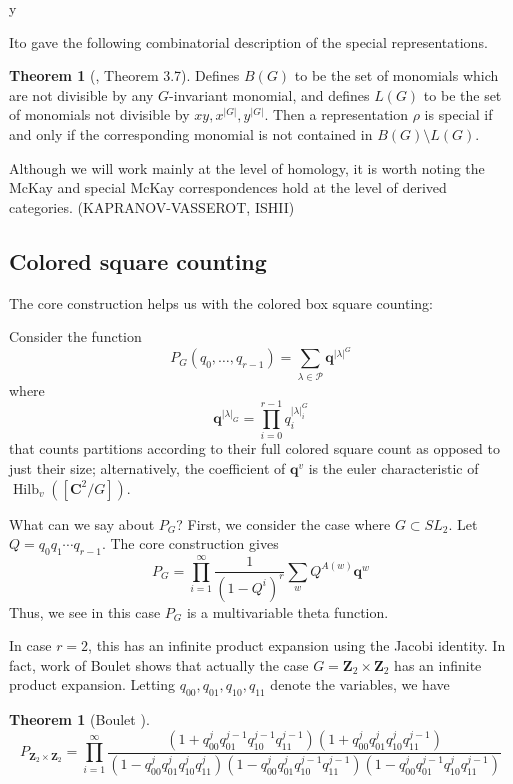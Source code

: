 y\documentclass{amsart}[12pt]
\theoremstyle{definition}
\newtheorem{theorem}[dummy]{Theorem}
\newcommand{\Z}{\mathbf{Z}}
\newcommand{\C}{\mathbf{C}}
\DeclareMathOperator{\Hilb}{Hilb}
\begin{document}
Ito \cite{ito} gave the following combinatorial description of the special representations.  

\begin{theorem}[\cite{ito}, Theorem 3.7]
Defines $B(G)$ to be the set of monomials which are not divisible by any $G$-invariant monomial, and defines $L(G)$ to be the set of monomials not divisible by $xy, x^{|G|}, y^{|G|}$.  Then a representation $\rho$ is special if and only if the corresponding monomial is not contained in $B(G)\setminus L(G)$.
\end{theorem}


Although we will work mainly at the level of homology, it is worth noting the McKay and special McKay correspondences hold at the level of derived categories.  (KAPRANOV-VASSEROT, ISHII)


\subsection{Colored square counting}

The core construction helps us with the colored box square counting:

Consider the function
$$P_G(q_0,\dots,q_{r-1})=\sum_{\lambda\in\mathcal{P}} \mathbf{q}^{|\lambda|^G}$$
where 
$$\mathbf{q}^{|\lambda|_G}=\prod_{i=0}^{r-1} q_i^{|\lambda|^G_i}$$
that counts partitions according to their full colored square count as opposed to just their size; alternatively, the coefficient of $\mathbf{q}^v$ is the euler characteristic of $\Hilb_v([\C^2/G])$.

What can we say about $P_G$?  First, we consider the case where $G\subset SL_2$.  Let $Q=q_0q_1\cdots q_{r-1}$.  The core construction gives
$$P_G=\prod_{i=1}^\infty\frac{1}{(1-Q^i)^r} \sum_{w} Q^{A(w)}\mathbf{q}^w $$
Thus, we see in this case $P_G$ is a multivariable theta function.

In case $r=2$, this has an infinite product expansion using the Jacobi identity.  In fact, work of Boulet shows that actually the case $G=\Z_2\times \Z_2$ has an infinite product expansion.  Letting $q_{00}, q_{01}, q_{10}, q_{11}$ denote the variables, we have

\begin{theorem}[Boulet \cite{boulet}]
$$P_{\Z_2\times\Z_2}=\prod_{i=1}^\infty \frac{(1+q_{00}^jq_{01}^{j-1}q_{10}^{j-1}q_{11}^{j-1})(1+q_{00}^jq_{01}^jq_{10}^jq_{11}^{j-1})}{(1-q_{00}^jq_{01}^jq_{10}^jq_{11}^j)(1-q_{00}^jq_{01}^jq_{10}^{j-1}q_{11}^{j-1})(1-q_{00}^jq_{01}^{j-1}q_{10}^{j}q_{11}^{j-1})}$$
\end{theorem}
\end{document}
